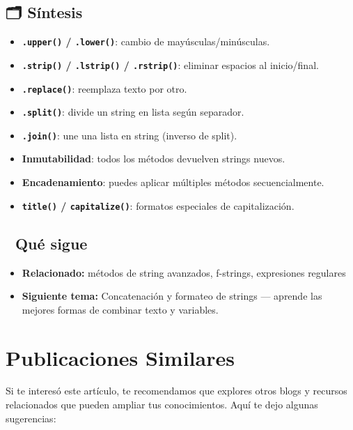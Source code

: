 \documentclass[
  doc,
  floatsintext,
  longtable,
  a4paper,
  nolmodern,
  notxfonts,
  notimes,
  12pt,
  colorlinks=true,linkcolor=blue,citecolor=blue,urlcolor=blue]{apa7}
\providecommand{\tightlist}{%
  \setlength{\itemsep}{0pt}\setlength{\parskip}{0pt}}
\begin{document}
\subsection{🗂️ Síntesis}\label{suxedntesis}

\begin{itemize}
\tightlist
\item
  \textbf{\texttt{.upper()} / \texttt{.lower()}}: cambio de
  mayúsculas/minúsculas.
\item
  \textbf{\texttt{.strip()} / \texttt{.lstrip()} / \texttt{.rstrip()}}:
  eliminar espacios al inicio/final.
\item
  \textbf{\texttt{.replace()}}: reemplaza texto por otro.
\item
  \textbf{\texttt{.split()}}: divide un string en lista según separador.
\item
  \textbf{\texttt{.join()}}: une una lista en string (inverso de split).
\item
  \textbf{Inmutabilidad}: todos los métodos devuelven strings nuevos.
\item
  \textbf{Encadenamiento}: puedes aplicar múltiples métodos
  secuencialmente.
\item
  \textbf{\texttt{title()} / \texttt{capitalize()}}: formatos especiales
  de capitalización.
\end{itemize}

\subsection{🔗 Qué sigue}\label{quuxe9-sigue}

\begin{itemize}
\tightlist
\item
  \textbf{Relacionado:} métodos de string avanzados, f-strings,
  expresiones regulares
\item
  \textbf{Siguiente tema:} Concatenación y formateo de strings ---
  aprende las mejores formas de combinar texto y variables.
\end{itemize}

\section{Publicaciones Similares}\label{publicaciones-similares}

Si te interesó este artículo, te recomendamos que explores otros blogs y
recursos relacionados que pueden ampliar tus conocimientos. Aquí te dejo
algunas sugerencias:
\end{document}

